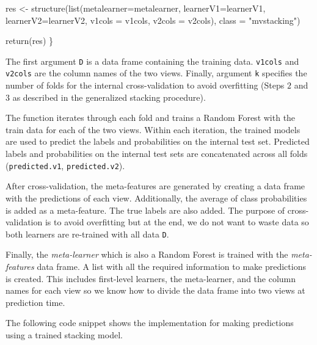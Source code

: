 \documentclass[
  11pt,
]{krantz}
\newenvironment{Shaded}{\begin{snugshade}}{\end{snugshade}}
\newcommand{\AttributeTok}[1]{\textcolor[rgb]{0.61,0.61,0.61}{#1}}
\newcommand{\FunctionTok}[1]{\textcolor[rgb]{0,0,0}{#1}}
\newcommand{\NormalTok}[1]{#1}
\newcommand{\OtherTok}[1]{\textcolor[rgb]{0.37,0.37,0.37}{#1}}
\newcommand{\StringTok}[1]{\textcolor[rgb]{0.5,0.5,0.5}{#1}}
\begin{document}
\begin{Shaded}
\begin{Highlighting}[]
\NormalTok{  res }\OtherTok{\textless{}{-}} \FunctionTok{structure}\NormalTok{(}\FunctionTok{list}\NormalTok{(}\AttributeTok{metalearner=}\NormalTok{metalearner,}
                        \AttributeTok{learnerV1=}\NormalTok{learnerV1,}
                        \AttributeTok{learnerV2=}\NormalTok{learnerV2,}
                        \AttributeTok{v1cols =}\NormalTok{ v1cols,}
                        \AttributeTok{v2cols =}\NormalTok{ v2cols),}
                   \AttributeTok{class =} \StringTok{"mvstacking"}\NormalTok{)}
  
  \FunctionTok{return}\NormalTok{(res)}
\NormalTok{\}}
\end{Highlighting}
\end{Shaded}

The first argument \texttt{D} is a data frame containing the training data. \texttt{v1cols} and \texttt{v2cols} are the column names of the two views. Finally, argument \texttt{k} specifies the number of folds for the internal cross-validation to avoid overfitting (Steps \(2\) and \(3\) as described in the generalized stacking procedure).

The function iterates through each fold and trains a Random Forest with the train data for each of the two views. Within each iteration, the trained models are used to predict the labels and probabilities on the internal test set. Predicted labels and probabilities on the internal test sets are concatenated across all folds (\texttt{predicted.v1}, \texttt{predicted.v2}).

After cross-validation, the meta-features are generated by creating a data frame with the predictions of each view. Additionally, the average of class probabilities is added as a meta-feature. The true labels are also added. The purpose of cross-validation is to avoid overfitting but at the end, we do not want to waste data so both learners are re-trained with all data \texttt{D}.

Finally, the \emph{meta-learner} which is also a Random Forest is trained with the \emph{meta-features} data frame. A list with all the required information to make predictions is created. This includes first-level learners, the meta-learner, and the column names for each view so we know how to divide the data frame into two views at prediction time.

The following code snippet shows the implementation for making predictions using a trained stacking model.
\end{document}

